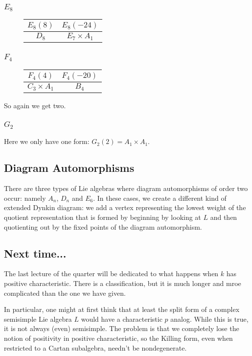 \documentclass[12pt]{article}
\theoremstyle{nonumberbreak}
\theoremstyle{changebreak}
\theoremstyle{nonumberbreak}
\theoremstyle{change}
\begin{document}
\subsubsection{$E_8$}
\begin{figure}[h]
	\centering
	\begin{tabular}{c|c}
		$E_8(8)$ & $E_8(-24)$ \\\hline
		$D_8$ & $E_7\times A_1$
	\end{tabular}
\end{figure}
\subsubsection{$F_4$}
\begin{figure}[h!]
	\centering
	\begin{tabular}{c|c}
		$F_4(4)$ & $F_4(-20)$ \\\hline
		$C_3\times A_1$ & $B_4$
	\end{tabular}
\end{figure}
So again we get two.
\subsubsection{$G_2$}
Here we only have one form: $G_2(2)=A_1\times A_1$.

\subsection{Diagram Automorphisms}
There are three types of Lie algebras where diagram automorphisms of order two occur: namely 
$A_n$, $D_n$ and $E_6$. In these cases, we create a different kind of extended Dynkin diagram:
we add a vertex representing the lowest weight of the quotient representation that is formed
by beginning by looking at $L$ and then quotienting out by the fixed points of the diagram 
automorphism.

\subsection{Next time...}
The last lecture of the quarter will be dedicated to what happens when $k$ has positive characteristic.
There is a classification, but it is much longer and mroe complicated than the one we have given. 

In particular, one might at first think that at least the split form of a complex semisimple Lie algebra
$L$ would have a characteristic $p$ analog. While this is true, it is not always (even) semisimple. 
The problem is that we completely lose the notion of positivity in positive characteristic, so 
the Killing form, even when restricted to a Cartan subalgebra, needn't be nondegenerate.
\end{document}
